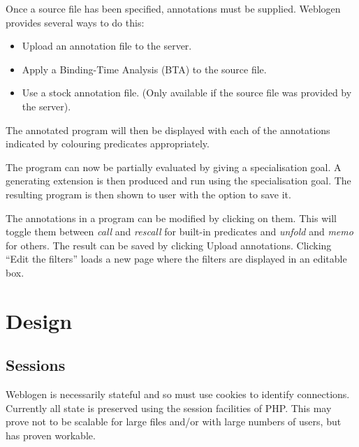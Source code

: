 \documentclass{report}
\begin{document}
Once a source file has been specified, annotations must be supplied. Weblogen
provides several ways to do this:

\begin{itemize}
\item Upload an annotation file to the server.
\item Apply a Binding-Time Analysis (BTA) to the source file.
\item Use a stock annotation file. (Only available if the source file was
provided by the server).
\end{itemize}

The annotated program will then be displayed with each of the annotations
indicated by colouring predicates appropriately.

The program can now be partially evaluated by giving a specialisation goal.
A generating extension is then produced and run using the specialisation
goal. The resulting program is then shown to user with the option to save it.

The annotations in a program can be modified by clicking on them. This will
toggle them between \emph{call} and \emph{rescall} for built-in predicates
and \emph{unfold} and \emph{memo} for others. The result can be saved by
clicking Upload annotations. Clicking ``Edit the filters'' loads a new page
where the filters are displayed in an editable box.

\chapter{Design}

\section{Sessions}

Weblogen is necessarily stateful and so must use cookies to identify
connections. Currently all state is preserved using the session facilities of
PHP. This may prove not to be scalable for large files and/or with large
numbers of users, but has proven workable.
\end{document}
